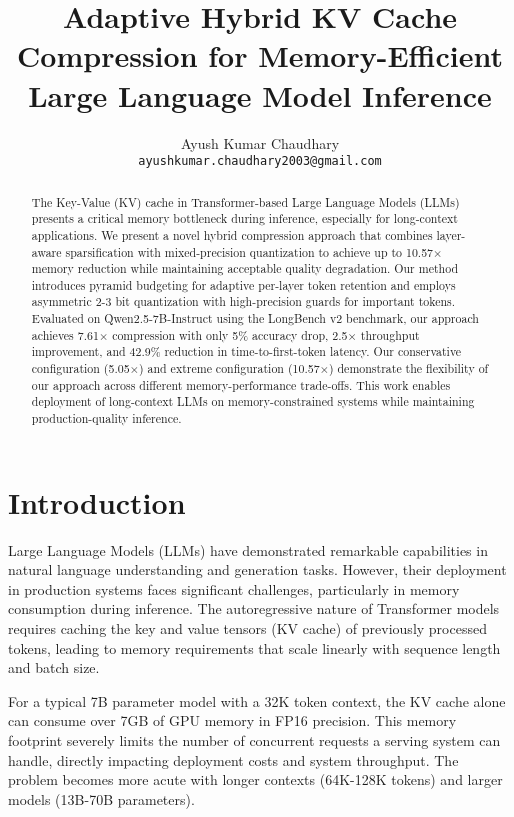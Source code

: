 \documentclass{article}
\title{Adaptive Hybrid KV Cache Compression for Memory-Efficient Large Language Model Inference}
\author{
  Ayush Kumar Chaudhary \\
  \texttt{ayushkumar.chaudhary2003@gmail.com}
}
\begin{document}
\maketitle

\begin{abstract}
The Key-Value (KV) cache in Transformer-based Large Language Models (LLMs) presents a critical memory bottleneck during inference, especially for long-context applications. We present a novel hybrid compression approach that combines layer-aware sparsification with mixed-precision quantization to achieve up to 10.57$\times$ memory reduction while maintaining acceptable quality degradation. Our method introduces pyramid budgeting for adaptive per-layer token retention and employs asymmetric 2-3 bit quantization with high-precision guards for important tokens. Evaluated on Qwen2.5-7B-Instruct using the LongBench v2 benchmark, our approach achieves 7.61$\times$ compression with only 5\% accuracy drop, 2.5$\times$ throughput improvement, and 42.9\% reduction in time-to-first-token latency. Our conservative configuration (5.05$\times$) and extreme configuration (10.57$\times$) demonstrate the flexibility of our approach across different memory-performance trade-offs. This work enables deployment of long-context LLMs on memory-constrained systems while maintaining production-quality inference.
\end{abstract}

\section{Introduction}

Large Language Models (LLMs) have demonstrated remarkable capabilities in natural language understanding and generation tasks. However, their deployment in production systems faces significant challenges, particularly in memory consumption during inference. The autoregressive nature of Transformer models requires caching the key and value tensors (KV cache) of previously processed tokens, leading to memory requirements that scale linearly with sequence length and batch size.

For a typical 7B parameter model with a 32K token context, the KV cache alone can consume over 7GB of GPU memory in FP16 precision. This memory footprint severely limits the number of concurrent requests a serving system can handle, directly impacting deployment costs and system throughput. The problem becomes more acute with longer contexts (64K-128K tokens) and larger models (13B-70B parameters).
\end{document}
